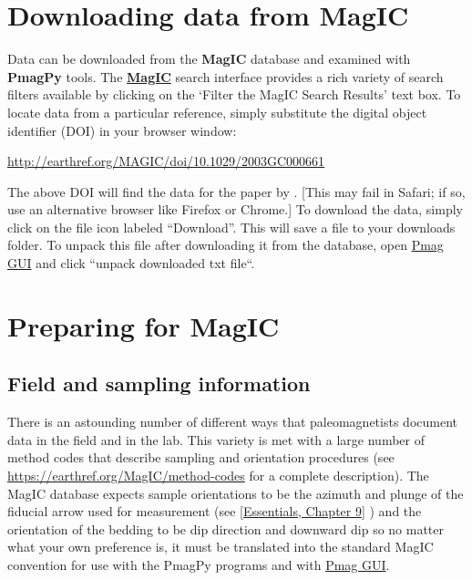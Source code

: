 \documentclass[11pt]{book}
\begin{document}
{{

\section{Downloading data from {\bf MagIC}}

Data can be downloaded from the {\bf MagIC} database and examined with {\bf PmagPy} tools.   The \href{http://earthref.org/MAGIC/search/}{\bf MagIC} search interface provides a rich variety of search filters available by clicking on the `Filter the MagIC Search Results' text box.    To locate data from a particular reference,  simply substitute the digital object identifier (DOI) in your browser window:

\href{http://earthref.org/MAGIC/doi/10.1029/2003GC000661}{http://earthref.org/MAGIC/doi/10.1029/2003GC000661}

\noindent The above DOI will find the data for the paper by \cite{tauxe04b}.  [This may fail in Safari; if so, use an alternative browser like Firefox or Chrome.]     To download the data, simply click on the file icon labeled ``Download''.  This will save a file to your downloads folder.
 To unpack this file after downloading it from the database, open \href{#pmag_gui.py}{Pmag GUI} and click ``unpack downloaded txt file``.


 \section{Preparing for MagIC}


\subsection{Field and sampling information}

 There is an astounding number of different ways that paleomagnetists document data in the field and in the lab. This variety is met with a large number  of method codes that describe sampling and orientation procedures (see \url{https://earthref.org/MagIC/method-codes} for a complete description).   The MagIC database expects sample orientations to be the azimuth and plunge of the fiducial arrow used for measurement (see  \href{http://earthref.org/MAGIC/books/Tauxe/Essentials/WebBook3ch2.html#ch2}{[Essentials, Chapter 9]} )  and the orientation of the bedding to be dip direction and downward dip so no matter what your own preference is, it must be translated into the standard MagIC convention for use with the PmagPy programs and with \href{#pmag_gui.py}{Pmag GUI}.

}}
\end{document}
